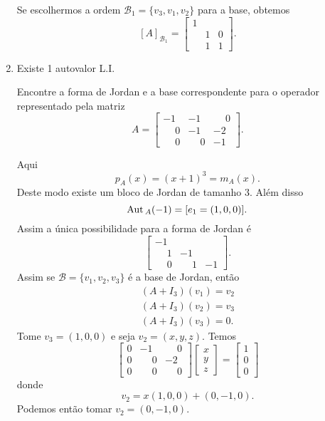 \begin{enumerate}
\begin{solucao}
		Se escolhermos a ordem $\mathcal{B}_1 = \{v_3, v_1, v_2\}$ para a base, obtemos
				\[
					[A]_{\mathcal{B}_1} = \begin{bmatrix}
				 			1 &  &\\
				 			& 1 & 0\\
				 			& 1 & 1
						\end{bmatrix}.
				\]

	\end{solucao}
	\item Existe 1 autovalor L.I.

	Encontre a forma de Jordan e a base correspondente para o operador representado pela matriz
	\[
		A = \begin{bmatrix}
			-1 & -1 & \phantom{-}0\\
			\phantom{-}0 & -1 & -2\\
			\phantom{-}0 & \phantom{-}0 & -1
		\end{bmatrix}.
	\]
	\begin{solucao}
	Aqui
	\[
		p_A(x) = (x + 1)^3 = m_A(x).
	\]
	Deste modo existe um bloco de Jordan de tamanho 3. Al\'em disso
	\[
		{\rm Aut\,}_A(-1) = [e_1 = (1,0,0)].
	\]
	Assim a \'unica possibilidade para a forma de Jordan \'e
	\[
		\begin{bmatrix}
			-1 & & \\
			\phantom{-}1 & -1 &\\
			\phantom{-}0 & \phantom{-}1 & -1
		\end{bmatrix}.
	\]
	Assim se $\mathcal{B} = \{v_1, v_2, v_3\}$ \'e a base de Jordan, ent\~ao
	\begin{align*}
		(A + I_3)(v_1) = v_2\\
		(A + I_3)(v_2) = v_3\\
		(A + I_3)(v_3) = 0.
	\end{align*}
	Tome $v_3 = (1,0,0)$ e seja $v_2 = (x,y,z)$. Temos
	\[
		\begin{bmatrix}
			0 & -1 & \phantom{-}0\\
			0 & \phantom{-}0 & -2\\
			0 & \phantom{-}0 & \phantom{-}0
		\end{bmatrix}\begin{bmatrix}
			x\\
			y\\
			z
		\end{bmatrix} = \begin{bmatrix}
			1\\
			0\\
			0
		\end{bmatrix}
	\]
	donde
	\[
		v_2 = x(1,0,0) + (0,-1,0).
	\]
	Podemos ent\~ao tomar $v_2 = (0,-1,0)$.


\end{solucao}
\end{enumerate}
